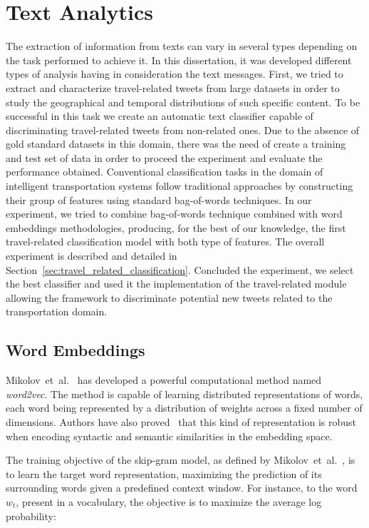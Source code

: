 \section{Text Analytics}\label{sec:text_analytics}

The extraction of information from texts can vary in several types depending on the task performed to achieve it. In this dissertation, it was developed different types of analysis having in consideration the text messages. First, we tried to extract and characterize travel-related tweets from large datasets in order to study the geographical and temporal distributions of such specific content. To be successful in this task we create an automatic text classifier capable of discriminating travel-related tweets from non-related ones. Due to the absence of gold standard datasets in this domain, there was the need of create a training and test set of data in order to proceed the experiment and evaluate the performance obtained. Conventional classification tasks in the domain of intelligent transportation systems follow traditional approaches by constructing their group of features using standard bag-of-words techniques. In our experiment, we tried to combine bag-of-words technique combined with word embeddings methodologies, producing, for the best of our knowledge, the first travel-related classification model with both type of features. The overall experiment is described and detailed in Section~\ref{sec:travel_related_classification}. Concluded the experiment, we select the best classifier and used it the implementation of the travel-related module allowing the framework to discriminate potential new tweets related to the transportation domain.





\subsection{Word Embeddings}
Mikolov~et~al.~\cite{mikolov2013efficient} has developed a powerful computational method named \emph{word2vec}. The method is capable of learning distributed representations of words, each word being represented by a distribution of weights across a fixed number of dimensions. Authors have also proved~\cite{mikolov2013linguistic} that this kind of representation is robust when encoding syntactic and semantic similarities in the embedding space.

The training objective of the skip-gram model, as defined by Mikolov~et~al.~\cite{mikolov2013linguistic}, is to learn the target word representation, maximizing the prediction of its surrounding words given a predefined context window. For instance, to the word $w_t$, present in a vocabulary, the objective is to maximize the average log probability:

